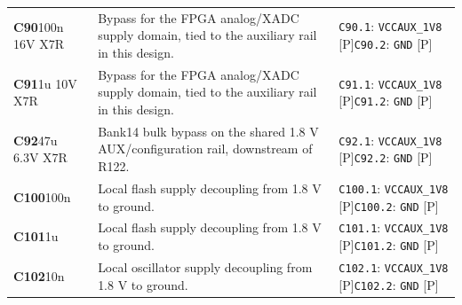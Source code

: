 \documentclass[11pt,a4paper]{article}
\begin{document}
\begin{longtable}{@{}P{27mm}P{83mm}P{58mm}@{}}
\textbf{C90}\newline 100n 16V X7R & Bypass for the FPGA analog/XADC supply domain, tied to the auxiliary rail in this design. & \nolinkurl{C90.1}: \nolinkurl{VCCAUX_1V8} [P]\newline \nolinkurl{C90.2}: \nolinkurl{GND} [P] \\
\textbf{C91}\newline 1u 10V X7R & Bypass for the FPGA analog/XADC supply domain, tied to the auxiliary rail in this design. & \nolinkurl{C91.1}: \nolinkurl{VCCAUX_1V8} [P]\newline \nolinkurl{C91.2}: \nolinkurl{GND} [P] \\
\textbf{C92}\newline 47u 6.3V X7R & Bank14 bulk bypass on the shared 1.8 V AUX/configuration rail, downstream of R122. & \nolinkurl{C92.1}: \nolinkurl{VCCAUX_1V8} [P]\newline \nolinkurl{C92.2}: \nolinkurl{GND} [P] \\
\textbf{C100}\newline 100n & Local flash supply decoupling from 1.8 V to ground. & \nolinkurl{C100.1}: \nolinkurl{VCCAUX_1V8} [P]\newline \nolinkurl{C100.2}: \nolinkurl{GND} [P] \\
\textbf{C101}\newline 1u & Local flash supply decoupling from 1.8 V to ground. & \nolinkurl{C101.1}: \nolinkurl{VCCAUX_1V8} [P]\newline \nolinkurl{C101.2}: \nolinkurl{GND} [P] \\
\textbf{C102}\newline 10n & Local oscillator supply decoupling from 1.8 V to ground. & \nolinkurl{C102.1}: \nolinkurl{VCCAUX_1V8} [P]\newline \nolinkurl{C102.2}: \nolinkurl{GND} [P] \\

\end{longtable}
\end{document}
